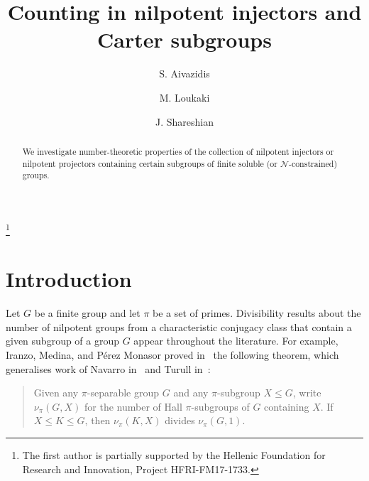 \documentclass[a4paper,12pt,reqno]{amsart}
\numberwithin{equation}{section}
\renewcommand{\leq}{\leqslant}
\begin{document}
\title{Counting in nilpotent injectors and Carter subgroups}

\author{S. Aivazidis}
\address{Department of Mathematics \& Applied Mathematics, University of Crete, Greece}
\author{M. Loukaki}
\address{Department of Mathematics \& Applied Mathematics, University of Crete, Greece}
\author{J. Shareshian}
\address{Department of Mathematics, Washington University, One Brookings Drive, St Louis, MO 63124 USA}


 \thanks{The first author is partially supported by the Hellenic Foundation for Research and Innovation, Project HFRI-FM17-1733.}

\begin{abstract}
We investigate number-theoretic properties of the collection of nilpotent injectors or nilpotent projectors containing certain subgroups of finite soluble (or ${\mathcal N}$-constrained) groups. 
\end{abstract}
\maketitle



\section{Introduction} 

Let $G$ be a finite group and let $\pi$ be a set of primes. Divisibility results about the number of nilpotent groups 
from a characteristic conjugacy class that contain a given subgroup of a group $G$ appear throughout the literature.  
For example, Iranzo, Medina, and P\'erez Monasor proved in~\cite{arithmetical_questions} the following theorem, 
which generalises work of Navarro in~\cite{Navarro} and Turull in~\cite{Turull}:
\begin{quote}
Given any $\pi$-separable group $G$ and any $\pi$-subgroup $X \leq G$, 
write $\nu_\pi(G,X)$ for the number of Hall $\pi$-subgroups of $G$ containing $X$. 
If $X \leq K \leq G$, then $\nu_\pi(K,X)$ divides $\nu_\pi(G,1)$.
\end{quote}
\end{document}
